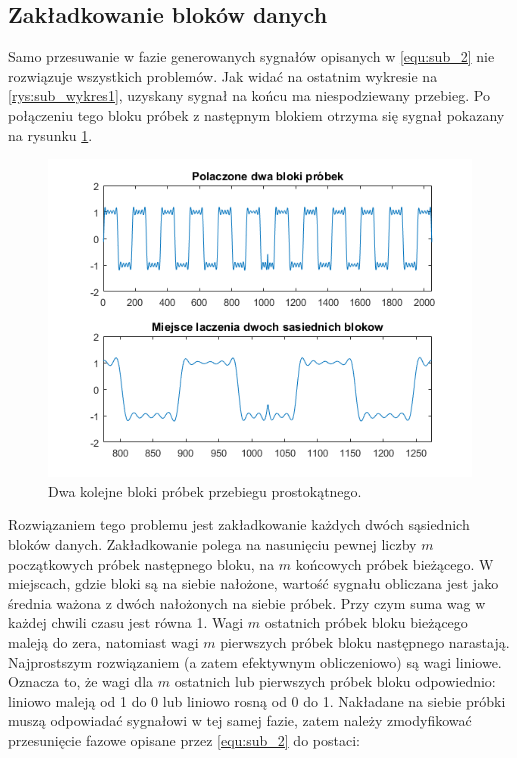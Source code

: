 \subsection{Zakładkowanie bloków danych}
Samo przesuwanie w fazie generowanych sygnałów opisanych w \ref{equ:sub_2} nie rozwiązuje wszystkich problemów. Jak widać na ostatnim wykresie na \ref{rys:sub_wykres1}, uzyskany sygnał na końcu ma niespodziewany przebieg. Po połączeniu tego bloku próbek z następnym blokiem otrzyma się sygnał pokazany na rysunku \ref{rys:sub_zakladkowania_brak}.
\begin{figure}[H]
	\centering
	\includegraphics[width=12cm]{grafiki/sub_zakladkowania_brak}
	\captionsetup{justification=centering}
	\caption{Dwa kolejne bloki próbek przebiegu prostokątnego.}
	\label{rys:sub_zakladkowania_brak}
\end{figure}
Rozwiązaniem tego problemu jest zakładkowanie każdych dwóch sąsiednich bloków danych. Zakładkowanie polega na nasunięciu pewnej liczby $m$ początkowych próbek następnego bloku, na $m$ końcowych próbek bieżącego. W miejscach, gdzie bloki są na siebie nałożone, wartość sygnału obliczana jest jako średnia ważona z dwóch nałożonych na siebie próbek. Przy czym suma wag w każdej chwili czasu jest równa 1. Wagi $m$ ostatnich próbek bloku bieżącego maleją do zera, natomiast wagi $m$ pierwszych próbek bloku następnego narastają. Najprostszym rozwiązaniem (a zatem efektywnym obliczeniowo) są wagi liniowe. Oznacza to, że wagi dla $m$ ostatnich lub pierwszych próbek bloku odpowiednio: liniowo maleją od 1 do 0 lub liniowo rosną od 0 do 1.
Nakładane na siebie próbki muszą odpowiadać sygnałowi w tej samej fazie, zatem należy zmodyfikować przesunięcie fazowe opisane przez \ref{equ:sub_2} do postaci:
